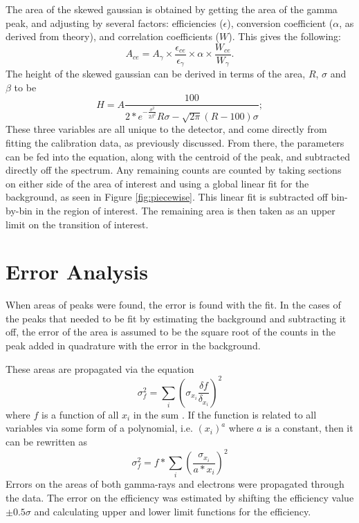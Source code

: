 

The area of the skewed gaussian is obtained by getting the area of the gamma peak, and adjusting by several factors: efficiencies ($\epsilon$), conversion coefficient ($\alpha$, as derived from theory), and correlation coefficients ($W$). This gives the following:
\begin{equation}
    A_{ce} = A_{\gamma}\times\frac{\epsilon_{ce}}{\epsilon_{\gamma}}\times\alpha\times\frac{W_{ce}}{W_{\gamma}}.
    \label{eq:subt_area_skew}
\end{equation}
The height of the skewed gaussian can be derived in terms of the area, $R$, $\sigma$ and $\beta$ to be
\begin{equation}
    H = A\frac{100}{2*e^{-\frac{\sigma^2}{2\beta^2}}R\sigma-\sqrt{2\pi}(R-100)\sigma};
    \label{eq:subt_height_skew}
\end{equation}
These three variables are all unique to the detector, and come directly from fitting the calibration data, as previously discussed. From there, the parameters can be fed into the equation, along with the centroid of the peak, and subtracted directly off the spectrum. Any remaining counts are counted by taking sections on either side of the area of interest and using a global linear fit for the background, as seen in Figure \ref{fig:piecewise}. This linear fit is subtracted off bin-by-bin in the region of interest. The remaining area is then taken as an upper limit on the transition of interest.



\section{Error Analysis}

When areas of peaks were found, the error is found with the fit. In the cases of the peaks that needed to be fit by estimating the background and subtracting it off, the error of the area is assumed to be the square root of the counts in the peak added in quadrature with the error in the background.

These areas are propagated via the equation
\begin{equation}
    \sigma_{f}^2=\sum_{i}\left(\sigma_{x_i}\frac{\delta f}{\delta_{x_i}}\right)^2
\end{equation}
where $f$ is a function of all $x_i$ in the sum \citep{bevington03:_error}. If the function is related to all variables via some form of a polynomial, i.e. $(x_i)^a$ where $a$ is a constant, then it can be rewritten as
\begin{equation}
    \sigma_{f}^2=f*\sum_{i}\left(\frac{\sigma_{x_i}}{a*x_i}\right)^2
\end{equation}
Errors on the areas of both gamma-rays and electrons were propagated through the data. The error on the efficiency was estimated by shifting the efficiency value $\pm0.5\sigma$ and calculating upper and lower limit functions for the efficiency. 


